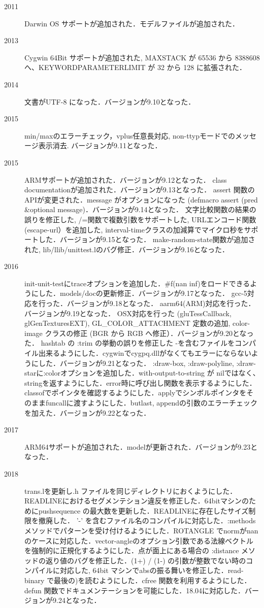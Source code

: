 \begin{description}
\item[2011] Darwin OS サポートが追加された．モデルファイルが追加された．
\item[2013] Cygwin 64Bit サポートが追加された, MAXSTACK が 65536 から 8388608 へ、KEYWORDPARAMETERLIMIT が 32 から 128 に拡張された．
\item[2014] 文書がUTF-8 になった．バージョンが9.10となった．
\item[2015] min/maxのエラーチェック，vplus任意長対応, non-ttypモードでのメッセージ表示消去. バージョンが9.11となった．
\item[2015] ARMサポートが追加された．バージョンが9.12となった．
            class documentationが追加された．バージョンが9.13となった．
            assert 関数のAPIが変更された．message がオプションになった (defmacro assert (pred \&optional message)．バージョンが9.14となった．
            文字比較関数の結果の誤りを修正した, /=関数で複数引数をサポートした, URLエンコード関数(escape-url）を追加した, interval-timeクラスの加減算でマイクロ秒をサポートした．バージョンが9.15となった．
            make-random-state関数が追加された, lib/llib/unittest.lのバグ修正．バージョンが9.16となった．
\item[2016] init-unit-testにtraceオプションを追加した．\#f(nan inf)をロードできるようにした．models/docの更新修正．バージョンが9.17となった．
            gcc-5対応を行った．バージョンが9.18となった．
            aarm64(ARM)対応を行った．バージョンが9.19となった． OSX対応を行った (gluTessCallback, glGenTexturesEXT), GL\_COLOR\_ATTACHMENT 定数の追加, color-image クラスの修正 (BGR から RGB へ修正）．バージョンが9.20となった．
            hashtab の :trim の挙動の誤りを修正した -を含むファイルをコンパイル出来るようにした．cygwinでcygpq.dllがなくてもエラーにならないようにした．バージョンが9.21となった．
            :draw-box, :draw-polyline, :draw-starに:colorオプションを追加した．with-output-to-string が nilではなく、stringを返すようにした．error時に呼び出し関数を表示するようにした．classofでポインタを確認するようにした．applyでシンボルポインタをそのままfuncallに渡すようにした．butlast, appendの引数のエラーチェックを加えた．バージョンが9.22となった．
\item[2017] ARM64サポートが追加された．modelが更新された．バージョンが9.23となった．
\item[2018] trans.lを更新し.h ファイルを同じディレクトリにおくようにした．READLINEにおけるセグメンテション違反を修正した．64bitマシンのためにpushsequence の最大数を更新した．READLINEに存在したサイズ制限を撤廃した． '-' を含むファイル名のコンパイルに対応した．:methods メソッドでパターンを受け付けるようにした．ROTANGLE でnormがnanのケースに対応した．vector-angleのオプション引数である法線ベクトルを強制的に正規化するようにした．点が面上にある場合の :distance メソッドの返り値のバグを修正した．(1+) / (1-) の引数が整数でない時のコンパイルに対応した, 64bit マシンでabsの振る舞いを修正した．read-binary で最後の)を読むようにした．cfree 関数を利用するようにした．defun 関数でドキュメンテーションを可能にした．18.04に対応した．バージョンが9.24となった．

\end{description}
